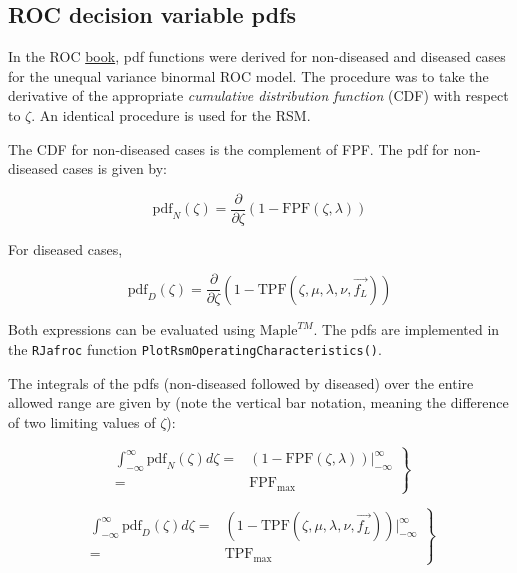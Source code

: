 \documentclass[
]{book}
\begin{document}
\hypertarget{rsm-predictions-roc-curve-pdfs}{%
\subsection{ROC decision variable pdfs}\label{rsm-predictions-roc-curve-pdfs}}

In the ROC \href{https://dpc10ster.github.io/RJafrocRocBook/}{book}, pdf functions were derived for non-diseased and diseased cases for the unequal variance binormal ROC model. The procedure was to take the derivative of the appropriate \emph{cumulative distribution function} (CDF) with respect to \(\zeta\). An identical procedure is used for the RSM.

The CDF for non-diseased cases is the complement of FPF. The pdf for non-diseased cases is given by:

\begin{equation}
\text{pdf}_N\left ( \zeta \right ) = \frac{\partial }{\partial \zeta} \left ( 1-\text{FPF}\left (\zeta , \lambda\right ) \right ) 
\label{eq:rsm-predictions-pdf-n}
\end{equation}

For diseased cases,

\begin{equation}
\text{pdf}_D\left ( \zeta \right ) = \frac{\partial }{\partial \zeta} \left ( 1-\text{TPF}\left (\zeta , \mu, \lambda, \nu, \overrightarrow{f_L} \right ) \right ) 
\label{eq:rsm-predictions-pdf-d}
\end{equation}

Both expressions can be evaluated using \(\text{Maple}^{TM}\). The pdfs are implemented in the \texttt{RJafroc} function \texttt{PlotRsmOperatingCharacteristics()}.

The integrals of the pdfs (non-diseased followed by diseased) over the entire allowed range are given by (note the vertical bar notation, meaning the difference of two limiting values of \(\zeta\)):

\begin{equation}
\left. 
\begin{aligned}
\int_{-\infty}^{\infty}\text{pdf}_N \left ( \zeta \right )d \zeta =& \left ( 1-\text{FPF}\left (\zeta , \lambda\right ) \right ) \bigg \rvert_{-\infty}^{\infty}\\
=& \text{FPF}_{\text{max}}
\end{aligned}
\right \}
\label{eq:rsm-predictions-int-pdf-n}
\end{equation}

\begin{equation}
\left. 
\begin{aligned}
\int_{-\infty}^{\infty}\text{pdf}_D \left ( \zeta \right )d \zeta =& \left ( 1-\text{TPF}\left (\zeta , \mu, \lambda, \nu, \overrightarrow{f_L} \right ) \right ) \bigg \rvert_{-\infty}^{\infty}\\
=& \text{TPF}_{\text{max}}
\end{aligned}
\right \}
\label{eq:rsm-predictions-int-pdf-d}
\end{equation}
\end{document}
